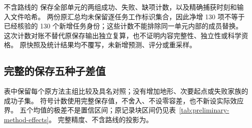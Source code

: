 \documentclass[UTF8,11pt]{ctexart}
\begin{document}
不含路线的 
保存全部单元的两组成功、失败、缺项计数，以及精确捕获时刻和输入文件哈希。
两份原汇总均未保留逐任务工作标识集合，因此净增 130 项不等于已经核验的
130 个新增任务身份；这些计数不能排除同一单元内部的成员替换。
这次计数对账不替代原保存输出独立复算，也不证明内容完整性、独立性或科学资格。
原快照及统计结果均不覆写，未新增预测、评分或重采样。

\clearpage
\subsection{完整的保存五种子差值}
\label{sec:method-seed-table}
表中保留每个原方法主组比较及具名对照；没有增加地形、次要起点或失败家族的成功子集。
符号计数使用完整保存值，不舍入、不设零容差，也不新设实际效应界。
五个均值的极差不是置信区间；原记录块区间仍见表~\ref{tab:preliminary-method-effects}。
完整精度、不含路线的投影为。


\clearpage
\end{document}
